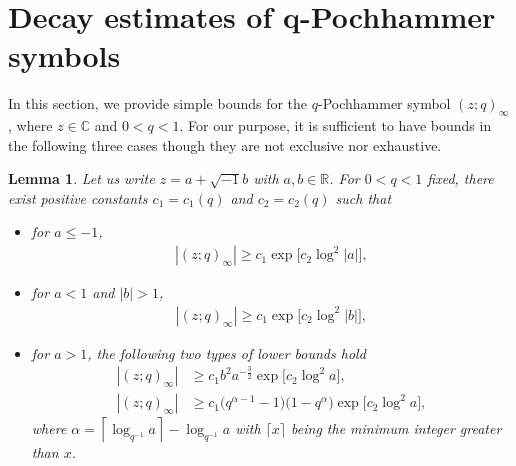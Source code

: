 \documentclass[pdftex]{sigma}
\numberwithin{equation}{section}
\newtheorem{Lemma}[Theorem]{Lemma}
\def\a{\alpha}
\def\C{\mathbb{C}}
\def\i{\infty}
\def\R{\mathbb{R}}
\begin{document}
\section[Decay estimates of q-Pochhammer symbols]{Decay estimates of $\boldsymbol{q}$-Pochhammer symbols}
\label{ac}
In this section, we provide simple bounds for
the $q$-Pochhammer symbol $(z;q)_{\i}$, where
$z\in\C$ and $0<q<1$. For our purpose, it is sufficient
to have bounds in the following three cases though
they are not exclusive nor exhaustive.
\begin{Lemma}\label{lc1}
 Let us write $z=a+\sqrt{-1}b$ with $a,b\in\R$.
 For $0<q<1$ fixed, there exist positive constants
 $c_1=c_1(q)$ and $c_2=c_2(q)$ such that
 \begin{itemize}\itemsep=0pt
 \item[\rm{(i)}] for $a\le -1$,
 \begin{align}
 \label{lc1-1}
 |(z;q)_\i|\ge c_1 \exp \big[c_2\log^2 |a|\big],
 \end{align}
 \item[\rm{(ii)}] for $a<1$ and $|b|>1$,
 \begin{align}
 \label{lc1-2}
 |(z;q)_\i|\ge c_1 \exp\big[c_2\log^2 |b|\big],
 \end{align}
 \item[\rm{(iii)}] for $a>1$,
 the following two types of lower bounds
 hold
 \begin{align}
 \label{lc1-3}
 |(z;q)_\i|
 &\ge c_1 b^2 a^{-\frac32}
 \exp\big[c_2\log^2 a\big],\\
 \label{lc1-3'}
 |(z;q)_\i|
 &\ge c_1 \big(q^{\a-1}-1\big)\big(1-q^{\a}\big)
 \exp\big[c_2\log^2 a\big],
 \end{align}
 where $\a=\left\lceil \log_{q^{-1}}a\right\rceil-\log_{q^{-1}}a$
 with $\lceil x\rceil$ being the minimum integer
 greater than $x$.
 \end{itemize}
\end{Lemma}
\end{document}
